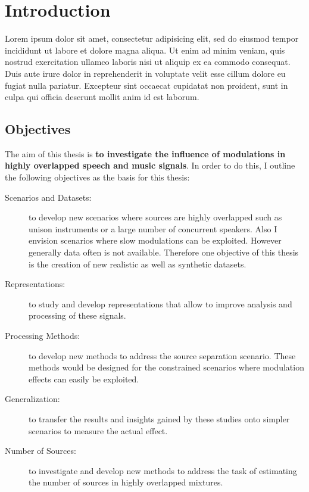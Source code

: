 \chapter{Introduction}\label{ch:introduction}

Lorem ipsum dolor sit amet, consectetur adipisicing elit, sed do eiusmod tempor incididunt ut labore et dolore magna aliqua. Ut enim ad minim veniam, quis nostrud exercitation ullamco laboris nisi ut aliquip ex ea commodo consequat. Duis aute irure dolor in reprehenderit in voluptate velit esse cillum dolore eu fugiat nulla pariatur. Excepteur sint occaecat cupidatat non proident, sunt in culpa qui officia deserunt mollit anim id est laborum.


\section{Objectives}

The aim of this thesis is \textbf{to investigate the influence of modulations in highly overlapped speech and music signals}.
In order to do this, I outline the following objectives as the basis for this thesis:

\begin{description}
  \item[Scenarios and Datasets:] to develop new scenarios where sources are highly overlapped such as unison instruments or a large number of concurrent speakers. Also I envision scenarios where slow modulations can be exploited. However generally data often is not available. Therefore one objective of this thesis is the creation          of new realistic as well as synthetic datasets.
  \item[Representations:] 
    to study and develop representations that allow to improve analysis and processing of these signals.
  \item[Processing Methods:] to develop new methods to address the source separation scenario. These methods would be designed for the constrained scenarios where modulation effects can easily be exploited.
  \item[Generalization:] to transfer the results and insights gained by these
    studies onto simpler scenarios to measure the actual effect.
  \item[Number of Sources:] to investigate and develop new methods to address the task of estimating the number of sources in highly overlapped mixtures.
\end{description}


